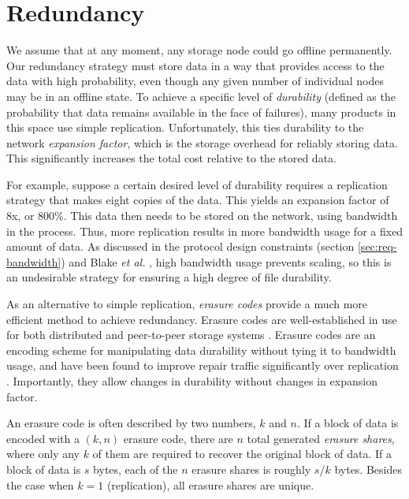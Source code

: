 \documentclass[8pt,fleqn,openany]{book}
\begin{document}
\section{Redundancy}\label{sec:framework-redundancy}

We assume that at any moment, any storage node could go offline permanently.
Our redundancy
strategy must store data in a way that provides access to the data with high
probability, even though any given number of individual nodes may be in
an offline state. To
achieve a specific level of {\em durability} (defined as the probability that
data remains available in the face of failures), many products in this space use
simple replication. Unfortunately, this ties durability to the network {\em
expansion factor}, which is the storage overhead for reliably storing data. This
significantly increases the total cost relative to the stored data.

For example, suppose a certain desired level of durability requires a
replication strategy that makes eight copies of the data. This yields an
expansion factor of 8x, or 800\%. This data then needs to be stored on the
network, using bandwidth in the process. Thus, more replication results in more
bandwidth usage for a fixed amount of data. As discussed in the protocol design
constraints (section \ref{sec:req-bandwidth}) and Blake {\em et al.}
\cite{pick2-churn},
high bandwidth usage prevents scaling, so this is an undesirable
strategy for ensuring a high degree of file durability.

As an alternative to simple replication, {\em erasure codes} provide a much
more efficient method to achieve redundancy.
Erasure codes are well-established in use for both distributed and peer-to-peer
storage systems \cite{p2p-lazy, storj-v2, rs-cd, rs-intro, rs-stragglers, hail,
filefec-packing}.
Erasure codes are an encoding scheme for manipulating
data durability without tying it to bandwidth usage, and have been found to
improve repair traffic significantly over replication \cite{pick2-churn}.
Importantly, they allow changes in durability without changes in expansion
factor.

An erasure code is often described by two numbers, $k$ and $n$. If a block of
data is encoded with a $(k,n)$ erasure code, there are $n$ total generated {\em
erasure shares}, where only any $k$ of them are required to recover the original
block of data. If a block of data is $s$ bytes, each of the $n$ erasure shares
is roughly $s/k$ bytes. Besides the case when $k=1$ (replication), all erasure
shares are unique.
\end{document}
